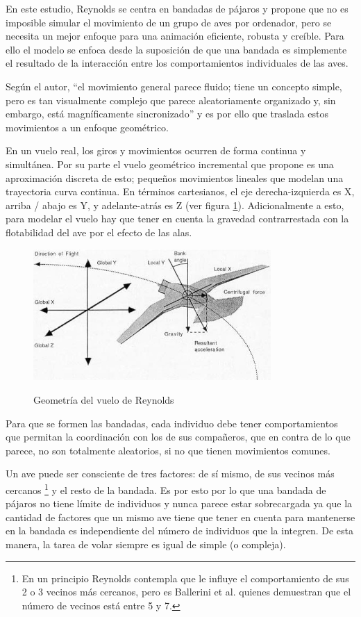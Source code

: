 En este estudio, Reynolds se centra en bandadas de pájaros y propone que no es imposible simular el movimiento de un grupo de aves por ordenador, pero se necesita un mejor enfoque para una animación eficiente, robusta y creíble. Para ello el modelo se enfoca desde la suposición de que una bandada es simplemente el resultado de la interacción entre los comportamientos individuales de las aves.

Según el autor, ``el movimiento general parece fluido; tiene un concepto simple, pero es tan visualmente complejo que parece aleatoriamente organizado y, sin embargo, está magníficamente sincronizado'' y es por ello que traslada estos movimientos a un enfoque geométrico.

En un vuelo real, los giros y movimientos ocurren de forma continua y simultánea. Por su parte el vuelo geométrico incremental que propone es una aproximación discreta de esto; pequeños movimientos lineales que modelan una trayectoria curva continua. En términos cartesianos, el eje derecha-izquierda es X, arriba / abajo es Y, y adelante-atrás es Z (ver figura \ref{fig:geometricalFlight}). Adicionalmente a esto, para modelar el vuelo hay que tener en cuenta la gravedad contrarrestada con la flotabilidad del ave por el efecto de las alas.

\begin{figure}[h!]
    \centering
    {\includegraphics[height=5cm]{fig/cap02/geometricalFlight.JPG}}
    \caption{Geometría del vuelo de Reynolds}
    \label{fig:geometricalFlight}
\end{figure}

Para que se formen las bandadas, cada individuo debe tener comportamientos que permitan la coordinación con los de sus compañeros, que en contra de lo que parece, no son totalmente aleatorios, si no que tienen movimientos comunes.

Un ave puede ser consciente de tres factores: de sí mismo, de sus vecinos más cercanos  \cite{ballerini2008interaction}\footnote{En un principio Reynolds contempla que le influye el comportamiento de sus 2 o 3 vecinos más cercanos, pero es Ballerini et al. quienes demuestran que el número de vecinos está entre 5 y 7.} y el resto de la bandada. Es por esto por lo que una bandada de pájaros no tiene límite de individuos y nunca parece estar sobrecargada ya que la cantidad de factores que un mismo ave tiene que tener en cuenta para mantenerse en la bandada es independiente del número de individuos que la integren. De esta manera, la tarea de volar siempre es igual de simple (o compleja).

